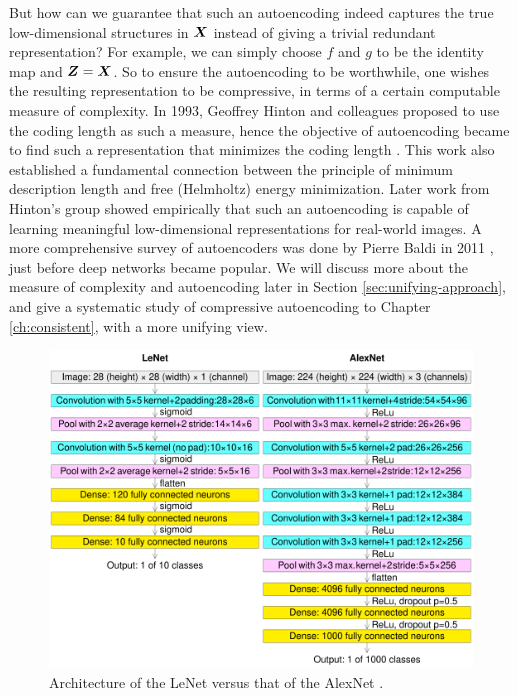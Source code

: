 \documentclass[../../book-main.tex]{subfiles}
\begin{document}
But how can we guarantee that such an autoencoding indeed captures the true low-dimensional structures in $\bm{X}$ instead of giving a trivial redundant representation? For example, we can simply choose $f$ and $g$ to be the identity map and $\bm{Z} = \bm{X}$. So to ensure the autoencoding to be worthwhile, one wishes the resulting representation to be compressive, in terms of a certain computable measure of complexity. In 1993, Geoffrey Hinton and colleagues proposed to use the coding length as such a measure, hence the objective of autoencoding became to find such a representation that minimizes the coding length \cite{Hinton-1993}. This work also established a fundamental connection between the principle of minimum description length \cite{Rissanen-1978} and free (Helmholtz) energy minimization. Later work \cite{Hinton504} from Hinton's group showed empirically that such an autoencoding is capable of learning meaningful low-dimensional representations for real-world images. A more comprehensive survey of autoencoders was done by Pierre Baldi in 2011 \cite{Baldi2011}, just before deep networks became popular. We will discuss more about the measure of complexity and autoencoding later in Section \ref{sec:unifying-approach}, and give a systematic study of compressive autoencoding to Chapter \ref{ch:consistent}, with a more unifying view.


\begin{figure}
    \centering
    \includegraphics[width=0.8\linewidth]{figures/Comparison_image_neural_networks.svg.png}
    \caption{Architecture of the LeNet \cite{LeCun-1989} versus that of the AlexNet \cite{krizhevsky2012imagenet}.}
    \label{fig:LeNet-AlexNet}
\end{figure}
\end{document}
